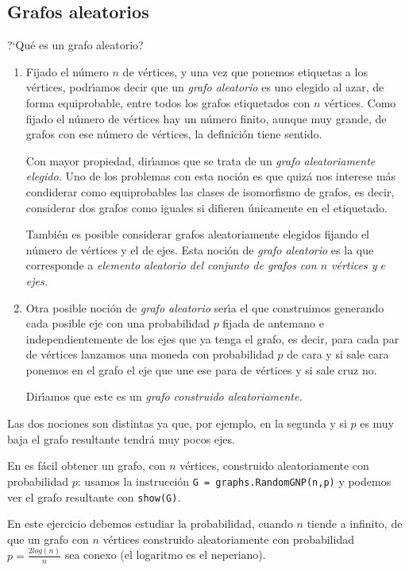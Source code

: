  \subsection{Grafos aleatorios}
  ?`Qu\'e es un grafo aleatorio?
  \begin{enumerate}
   \item Fijado el n\'umero $n$ de v\'ertices, y una vez que ponemos etiquetas 
a los v\'ertices, podr\'{\i}amos decir que un {\itshape grafo aleatorio} es uno 
elegido al azar, de forma equiprobable, entre todos los grafos etiquetados con 
$n$ v\'ertices. Como fijado el n\'umero de v\'ertices hay un n\'umero finito, 
aunque muy grande,  de grafos con ese n\'umero de v\'ertices, la definici\'on 
tiene sentido.

Con mayor propiedad, dir\'{\i}amos que se trata de un {\itshape grafo 
aleatoriamente elegido.} Uno de los problemas con esta noci\'on es que quiz\'a 
nos interese m\'as condiderar como equiprobables las clases de isomorfismo de 
grafos, es decir, considerar dos grafos como iguales si difieren \'unicamente 
en el etiquetado. 

Tambi\'en es posible considerar grafos aleatoriamente elegidos fijando el 
n\'umero de v\'ertices y el de ejes. Esta noci\'on de {\itshape grafo 
aleatorio} es la que corresponde a {\itshape elemento aleatorio del conjunto de 
grafos con $n$ v\'ertices y $e$ ejes.}
   
  \item Otra posible noci\'on de {\itshape grafo aleatorio} ser\'{\i}a el que 
construimos  generando cada posible eje con una probabilidad $p$ fijada de 
antemano e independientemente de los ejes que ya tenga el grafo, es decir, para 
cada par de v\'ertices lanzamos una moneda con probabilidad $p$ de cara y si 
sale cara ponemos en el grafo el eje que une ese para de v\'ertices y si sale 
cruz no. 

Dir\'{\i}amos que este es un {\itshape grafo construido aleatoriamente.}
 \end{enumerate}
 
 Las dos nociones son distintas ya que, por ejemplo, en la segunda y si $p$ es 
muy baja el grafo resultante tendr\'a muy pocos ejes.

En {\sage} es f\'acil obtener un grafo, con $n$ v\'ertices,  construido 
aleatoriamente con probabilidad $p$: usamos la instrucci\'on 
\lstinline|G = graphs.RandomGNP(n,p)| y podemos ver el grafo resultante con 
\lstinline|show(G)|.

\begin{ejer}
  En este ejercicio debemos estudiar la probabilidad, cuando $n$ tiende a 
infinito,  de que un grafo con $n$ v\'ertices construido aleatoriamente con 
probabilidad $p=\frac{2log(n)}{n}$ sea conexo (el logaritmo es el neperiano).
  \end{ejer}

